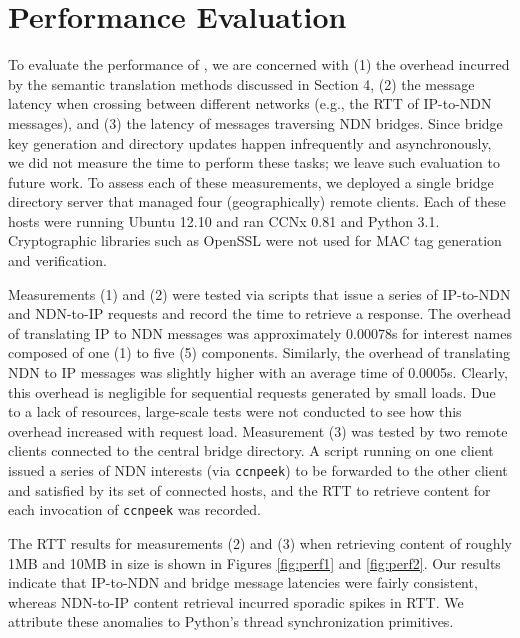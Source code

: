 \section{Performance Evaluation}
To evaluate the performance of \sink, we are concerned with (1) the overhead incurred by the semantic translation methods discussed in Section 4, (2) the message latency when crossing between different networks (e.g., the RTT of IP-to-NDN messages), and (3) the latency of messages traversing NDN bridges. Since bridge key generation and directory updates happen infrequently and asynchronously, we did not measure the time to perform these tasks; we leave such evaluation to future work. To assess each of these measurements, we deployed a single bridge directory server that managed four (geographically) remote clients. Each of these hosts were running Ubuntu 12.10 and ran CCNx 0.81 and Python 3.1. Cryptographic libraries such as OpenSSL were not used for MAC tag generation and verification. 

Measurements (1) and (2) were tested via scripts that issue a series of IP-to-NDN and NDN-to-IP requests and record the time to retrieve a response. The overhead of translating IP to NDN messages was approximately 0.00078s for interest names composed of one (1) to five (5) components. Similarly, the overhead of translating NDN to IP messages was slightly higher with an average time of 0.0005s. Clearly, this overhead is negligible for sequential requests generated by small loads. Due to a lack of resources, large-scale tests were not conducted to see how this overhead increased with request load. Measurement (3) was tested by two remote clients connected to the central bridge directory. A script running on one client issued a series of NDN interests (via {\tt ccnpeek}) to be forwarded to the other client and satisfied by its set of connected hosts, and the RTT to retrieve content for each invocation of {\tt ccnpeek} was recorded. 

The RTT results for measurements (2) and (3) when retrieving content of roughly 1MB and 10MB in size is shown in Figures \ref{fig:perf1} and \ref{fig:perf2}. Our results indicate that IP-to-NDN and bridge message latencies were fairly consistent, whereas NDN-to-IP content retrieval incurred sporadic spikes in RTT. We attribute these anomalies to Python's thread synchronization primitives. 

